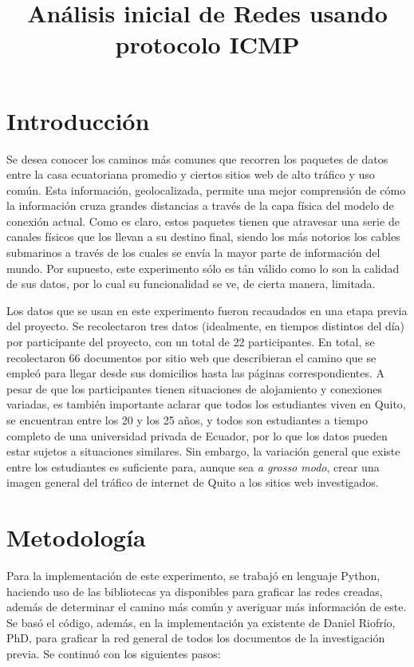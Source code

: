 \documentclass[11pt]{article}
\title{Análisis inicial de Redes usando protocolo ICMP}
\begin{document}
    
    \maketitle
    
    

    
    \hypertarget{introducciuxf3n}{%
\section{Introducción}\label{introducciuxf3n}}

Se desea conocer los caminos más comunes que recorren los paquetes de
datos entre la casa ecuatoriana promedio y ciertos sitios web de alto
tráfico y uso común. Esta información, geolocalizada, permite una mejor
comprensión de cómo la información cruza grandes distancias a través de
la capa física del modelo de conexión actual. Como es claro, estos
paquetes tienen que atravesar una serie de canales físicos que los
llevan a su destino final, siendo los más notorios los cables submarinos
a través de los cuales se envía la mayor parte de información del mundo.
Por supuesto, este experimento sólo es tán válido como lo son la calidad
de sus datos, por lo cual su funcionalidad se ve, de cierta manera,
limitada.

Los datos que se usan en este experimento fueron recaudados en una etapa
previa del proyecto. Se recolectaron tres datos (idealmente, en tiempos
distintos del día) por participante del proyecto, con un total de 22
participantes. En total, se recolectaron 66 documentos por sitio web que
describieran el camino que se empleó para llegar desde sus domicilios
hasta las páginas correspondientes. A pesar de que los participantes
tienen situaciones de alojamiento y conexiones variadas, es también
importante aclarar que todos los estudiantes viven en Quito, se
encuentran entre los 20 y los 25 años, y todos son estudiantes a tiempo
completo de una universidad privada de Ecuador, por lo que los datos
pueden estar sujetos a situaciones similares. Sin embargo, la variación
general que existe entre los estudiantes es suficiente para, aunque sea
\emph{a grosso modo}, crear una imagen general del tráfico de internet
de Quito a los sitios web investigados.

\hypertarget{metodologuxeda}{%
\section{Metodología}\label{metodologuxeda}}

Para la implementación de este experimento, se trabajó en lenguaje
Python, haciendo uso de las bibliotecas ya disponibles para graficar las
redes creadas, además de determinar el camino más común y averiguar más
información de este. Se basó el código, además, en la implementación ya
existente de Daniel Riofrío, PhD, para graficar la red general de todos
los documentos de la investigación previa. Se continuó con los
siguientes pasos:
\end{document}
